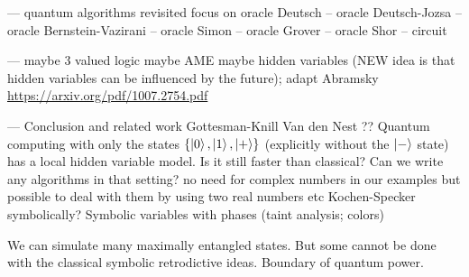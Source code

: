 \documentclass[aps,prl,twocolumn,superscriptaddress,floatfix,notitlepage]{revtex4-2}
\begin{document}
\bigskip 
---
quantum algorithms revisited
focus on oracle
Deutsch -- oracle
Deutsch-Jozsa -- oracle
Bernstein-Vazirani -- oracle
Simon -- oracle
Grover -- oracle
Shor -- circuit

\bigskip 
---
maybe 3 valued logic
maybe AME
maybe hidden variables (NEW idea is that hidden variables can be
influenced by the future); adapt Abramsky \url{https://arxiv.org/pdf/1007.2754.pdf} 

\bigskip 
---
Conclusion and related work
  Gottesman-Knill
  Van den Nest ??
  Quantum computing with only the states $\{\ket{0}, \ket{1},
    \ket{+}\}$  (explicitly without the $\ket{-}$ state) has a local
    hidden variable model. Is it still faster than classical? Can we
    write any algorithms in that setting? no need for complex numbers
    in our examples but possible to deal with them by using two real
    numbers etc 
  Kochen-Specker symbolically?
  Symbolic variables with phases (taint analysis; colors)

  We can simulate many maximally entangled states. But some cannot be
done with the classical symbolic retrodictive ideas. Boundary of
quantum power.
\end{document}
